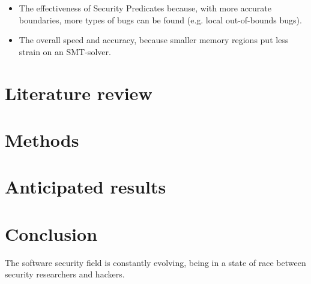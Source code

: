 \documentclass[conference]{IEEEtran}
\begin{document}
\begin{itemize}
    \item The effectiveness of Security Predicates because, with more accurate boundaries, more types of bugs can be found (e.g. local out-of-bounds bugs).
    \item The overall speed and accuracy, because smaller memory regions put less strain on an SMT-solver.
\end{itemize}



\section{Literature review}



\section{Methods}


\section{Anticipated results}


\section{Conclusion}

The software security field is constantly evolving, being in a state of race between security researchers and hackers.







\end{document}
